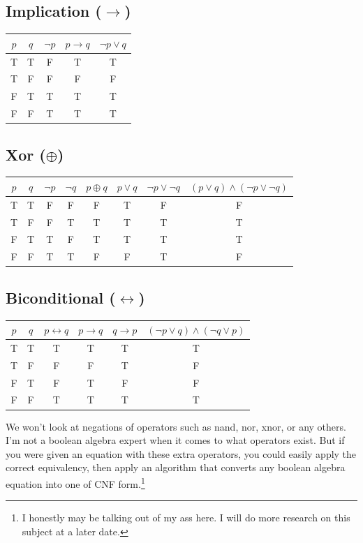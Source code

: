 \subsection*{Implication ($\rightarrow$)}

\begin{center}
\begin{tabular}{cc|c|c|c}
$p$ & $q$ & $\neg p$ & $p\rightarrow q$ & $\neg p\lor q$\\
\hline
T & T & F & T & T\\
T & F & F & F & F\\
F & T & T & T & T\\
F & F & T & T & T
\end{tabular}
\end{center}

\subsection*{Xor ($\oplus$)}

\begin{center}
\begin{tabular}{cc|cc|c|cc|c}
$p$ & $q$
& $\neg p$
& $\neg q$
& $p\oplus q$
& $p\lor q$
& $\neg p\lor\neg q$
& $(p\lor q)\land(\neg p\lor\neg q)$\\
\hline
T&T&F&F&F&T&F&F\\
T&F&F&T&T&T&T&T\\
F&T&T&F&T&T&T&T\\
F&F&T&T&F&F&T&F
\end{tabular}
\end{center}

\subsection*{Biconditional ($\leftrightarrow$)}

\begin{center}
\begin{tabular}{cc|c|cc|c}
$p$ & $q$
& $p\leftrightarrow q$
& $p\rightarrow q$
& $q\rightarrow p$
& $(\neg p\lor q)\land(\neg q\lor p)$\\
\hline
T&T&T&T&T&T\\
T&F&F&F&T&F\\
F&T&F&T&F&F\\
F&F&T&T&T&T
\end{tabular}
\end{center}

We won't look at negations of operators such as nand, nor, xnor, or any
others. I'm not a boolean algebra expert when it comes to what operators
exist. But if you were given an equation with these extra operators, you could
easily apply the correct equivalency, then apply an algorithm that converts any
boolean algebra equation into one of CNF form.\footnote{I honestly may be
talking out of my ass here. I will do more research on this subject at a later
date.}

